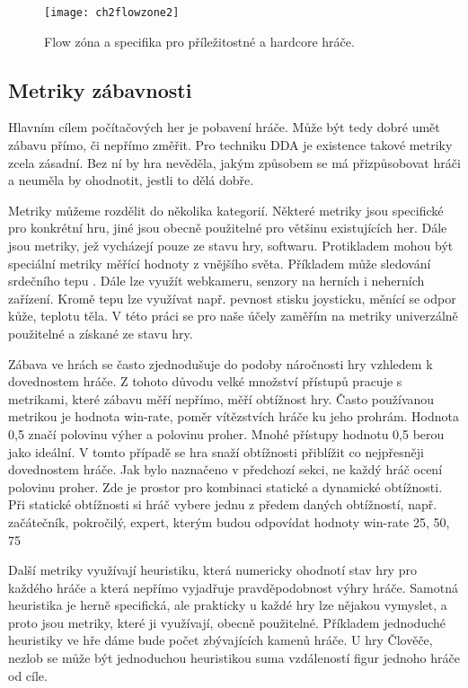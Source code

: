 \begin{figure}
  \centering
  \texttt{[image: ch2flowzone2]}
	\caption{Flow zóna a specifika pro příležitostné a hardcore hráče. \cite{thesisflow} }
	\label{fig:ch2flowzone2}
\end{figure}	

\subsection{Metriky zábavnosti} \label{sec:defzab}

Hlavním cílem počítačových her je pobavení hráče. Může být tedy dobré umět zábavu přímo, či nepřímo změřit. Pro techniku DDA je existence takové metriky zcela zásadní. Bez ní by hra nevěděla, jakým způsobem se má přizpůsobovat hráči a neuměla by ohodnotit, jestli to dělá dobře. 

Metriky můžeme rozdělit do několika kategorií. Některé metriky jsou specifické pro konkrétní hru, jiné jsou obecně použitelné pro většinu existujících her. Dále jsou metriky, jež vycházejí pouze ze stavu hry, softwaru. Protikladem mohou být speciální metriky měřící hodnoty z vnějšího světa. Příkladem může sledování srdečního tepu \cite{7}. Dále lze využít webkameru, senzory na herních i neherních zařízení. Kromě tepu lze využívat např. pevnost stisku joysticku, měnící se odpor kůže, teplotu těla.\cite{16Survey} V této práci se pro naše účely zaměřím na metriky univerzálně použitelné a získané ze stavu hry.

Zábava ve hrách se často zjednodušuje do podoby náročnosti hry vzhledem k dovednostem hráče. Z tohoto důvodu velké množství přístupů pracuje s metrikami, které zábavu měří nepřímo, měří obtížnost hry. Často používanou metrikou je hodnota win-rate, poměr vítězstvích hráče ku jeho prohrám. Hodnota 0,5 značí polovinu výher a polovinu proher. Mnohé přístupy hodnotu 0,5 berou jako ideální. V tomto případě se hra snaží obtížnosti přiblížit co nejpřesněji dovednostem hráče. Jak bylo naznačeno v předchozí sekci, ne každý hráč ocení polovinu proher. Zde je prostor pro kombinaci statické a dynamické obtížnosti. Při statické obtížnosti si hráč vybere jednu z předem daných obtížností, např. začátečník, pokročilý, expert, kterým budou odpovídat hodnoty win-rate 25, 50, 75 %

Další metriky využívají heuristiku, která numericky ohodnotí stav hry pro každého hráče a která nepřímo vyjadřuje pravděpodobnost výhry hráče. Samotná heuristika je herně specifická, ale prakticky u každé hry lze nějakou vymyslet, a proto jsou metriky, které ji využívají, obecně použitelné. Příkladem jednoduché heuristiky ve hře dáme bude počet zbývajících kamenů hráče. U hry Člověče, nezlob se může být jednoduchou heuristikou suma vzdáleností figur jednoho hráče od cíle.


